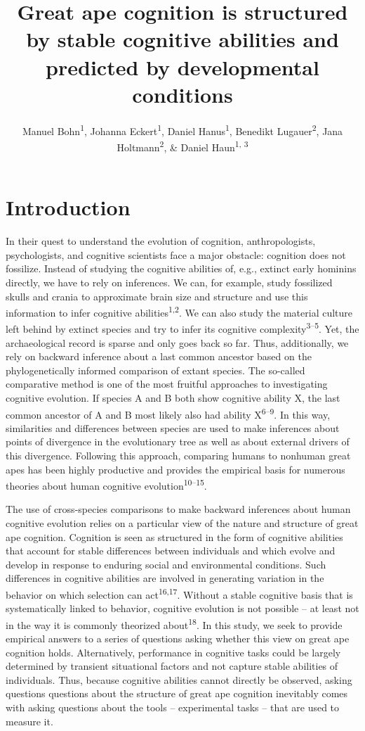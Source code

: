 \documentclass[
  man,floatsintext]{apa6}
\title{Great ape cognition is structured by stable cognitive abilities and predicted by developmental conditions}
\author{Manuel Bohn\textsuperscript{1}, Johanna Eckert\textsuperscript{1}, Daniel Hanus\textsuperscript{1}, Benedikt Lugauer\textsuperscript{2}, Jana Holtmann\textsuperscript{2}, \& Daniel Haun\textsuperscript{1, 3}}
\date{}
\affiliation{\vspace{0.5cm}\textsuperscript{1} Department of Comparative Cultural Psychology, Max Planck Institute for Evolutionary Anthropology, Leipzig, Germany\\\textsuperscript{2} Wilhelm Wundt Institute of Psychology, Leipzig University, Leipzig, Germany\\\textsuperscript{3} Leipzig Research Centre for Early Child Development, Leipzig University, Leipzig, Germany}
\begin{document}
\maketitle

\hypertarget{introduction}{%
\section{Introduction}\label{introduction}}

In their quest to understand the evolution of cognition, anthropologists, psychologists, and cognitive scientists face a major obstacle: cognition does not fossilize. Instead of studying the cognitive abilities of, e.g., extinct early hominins directly, we have to rely on inferences. We can, for example, study fossilized skulls and crania to approximate brain size and structure and use this information to infer cognitive abilities\textsuperscript{1,2}. We can also study the material culture left behind by extinct species and try to infer its cognitive complexity\textsuperscript{3--5}. Yet, the archaeological record is sparse and only goes back so far. Thus, additionally, we rely on backward inference about a last common ancestor based on the phylogenetically informed comparison of extant species. The so-called comparative method is one of the most fruitful approaches to investigating cognitive evolution. If species A and B both show cognitive ability X, the last common ancestor of A and B most likely also had ability X\textsuperscript{6--9}. In this way, similarities and differences between species are used to make inferences about points of divergence in the evolutionary tree as well as about external drivers of this divergence. Following this approach, comparing humans to nonhuman great apes has been highly productive and provides the empirical basis for numerous theories about human cognitive evolution\textsuperscript{10--15}.

The use of cross-species comparisons to make backward inferences about human cognitive evolution relies on a particular view of the nature and structure of great ape cognition. Cognition is seen as structured in the form of cognitive abilities that account for stable differences between individuals and which evolve and develop in response to enduring social and environmental conditions. Such differences in cognitive abilities are involved in generating variation in the behavior on which selection can act\textsuperscript{16,17}. Without a stable cognitive basis that is systematically linked to behavior, cognitive evolution is not possible -- at least not in the way it is commonly theorized about\textsuperscript{18}. In this study, we seek to provide empirical answers to a series of questions asking whether this view on great ape cognition holds. Alternatively, performance in cognitive tasks could be largely determined by transient situational factors and not capture stable abilities of individuals. Thus, because cognitive abilities cannot directly be observed, asking questions questions about the structure of great ape cognition inevitably comes with asking questions about the tools -- experimental tasks -- that are used to measure it.
\end{document}
